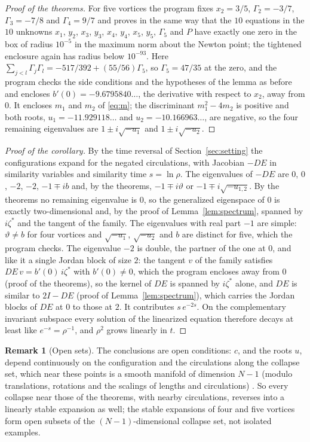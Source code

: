 \documentclass[11pt]{article}
\theoremstyle{definition}
\newtheorem{remark}{Remark}
\begin{document}
\begin{proof}[Proof of the theorems]
For five vortices the program fixes $x_2 = 3/5$, $\Gamma_2 = -3/7$, $\Gamma_3 = -7/8$ and $\Gamma_4 = 9/7$ and proves in the same way that the $10$ equations in the $10$ unknowns $x_1$, $y_2$, $x_3$, $y_3$, $x_4$, $y_4$, $x_5$, $y_5$, $\Gamma_5$ and $P$ have exactly one zero in the box of radius $10^{-5}$ in the maximum norm about the Newton point; the tightened enclosure again has radius below $10^{-93}$. Here $\sum_{j<l}\Gamma_j\Gamma_l = -517/392 + (55/56)\Gamma_5$, so $\Gamma_5 = 47/35$ at the zero, and the program checks the side conditions and the hypotheses of the lemma as before and encloses $b'(0) = -9.6795840\ldots$, the derivative with respect to $x_2$, away from $0$. It encloses $m_1$ and $m_2$ of \eqref{eq:m}; the discriminant $m_1^2 - 4m_2$ is positive and both roots, $u_1 = -11.929118\ldots$ and $u_2 = -10.166963\ldots$, are negative, so the four remaining eigenvalues are $1 \pm i\sqrt{-u_1}$ and $1 \pm i\sqrt{-u_2}$.
\end{proof}

\begin{proof}[Proof of the corollary]
By the time reversal of Section~\ref{sec:setting} the configurations expand for the negated circulations, with Jacobian $-DE$ in similarity variables and similarity time $s = \ln\rho$. The eigenvalues of $-DE$ are $0$, $0$, $-2$, $-2$, $-1 \mp ib$ and, by the theorems, $-1 \mp i\vartheta$ or $-1 \mp i\sqrt{-u_{1,2}}$. By the theorems no remaining eigenvalue is $0$, so the generalized eigenspace of $0$ is exactly two-dimensional and, by the proof of Lemma~\ref{lem:spectrum}, spanned by $i\zeta^*$ and the tangent of the family. The eigenvalues with real part $-1$ are simple: $\vartheta \ne b$ for four vortices and $\sqrt{-u_1}$, $\sqrt{-u_2}$ and $b$ are distinct for five, which the program checks. The eigenvalue $-2$ is double, the partner of the one at $0$, and like it a single Jordan block of size $2$: the tangent $v$ of the family satisfies $DE\,v = b'(0)\,i\zeta^*$ with $b'(0) \ne 0$, which the program encloses away from $0$ (proof of the theorems), so the kernel of $DE$ is spanned by $i\zeta^*$ alone, and $DE$ is similar to $2I - DE$ (proof of Lemma~\ref{lem:spectrum}), which carries the Jordan blocks of $DE$ at $0$ to those at $2$. It contributes $s\,e^{-2s}$. On the complementary invariant subspace every solution of the linearized equation therefore decays at least like $e^{-s} = \rho^{-1}$, and $\rho^2$ grows linearly in $t$.
\end{proof}

\begin{remark}[Open sets]\label{rem:open}
The conclusions are open conditions: $c$, and the roots $u$, depend continuously on the configuration and the circulations along the collapse set, which near these points is a smooth manifold of dimension $N - 1$ (modulo translations, rotations and the scalings of lengths and circulations) \cite[Sect.~7]{mw2026}. So every collapse near those of the theorems, with nearby circulations, reverses into a linearly stable expansion as well; the stable expansions of four and five vortices form open subsets of the $(N - 1)$-dimensional collapse set, not isolated examples.
\end{remark}
\end{document}
